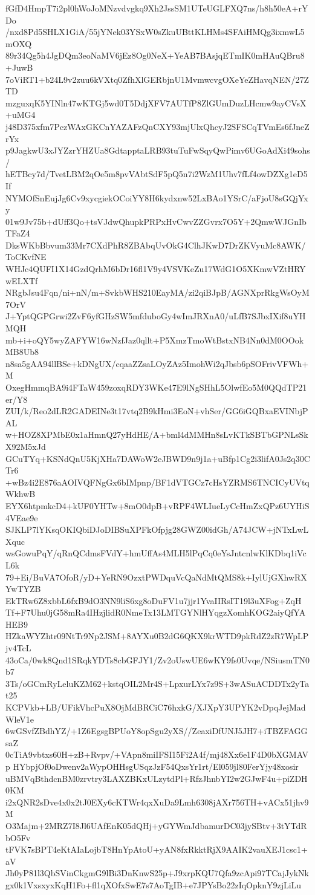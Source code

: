 fGfD4HmpT7i2pl0hWoJoMNzvdvgkq9Xh2JssSM1UTeUGLFXQ7ns/h8h50eA+rYDo
/nxd8Pd5SHLX1GiA/55jYNek03YSxW0sZkuUBttKLHMs4SFAiHMQg3ixmwL5mOXQ
89r34Qg5h4JgDQm3eoNaMV6jEz8Og0NeX+YeAB7BAsjqETmIK0mHAuQBru8+JuwB
7oViRT1+b24L9v2zuu6kVXtq0ZfhXlGERbjnU1MvmwcvgOXeYeZHavqNEN/27ZTD
mzguxqK5YINln47wKTGj5wd0T5DdjXFV7AUTfP8ZlGUmDuzLHcmw9ayCVsX+uMG4
j48D375xfm7PczWAxGKCnYAZAFzQnCXY93mjUlxQhcyJ2SFSCqTVmEs6fJneZrYx
p9JagkwU3xJYZzrYHZUa8GdtapptaLRB93tuTuFwSqyQwPimv6UGoAdXi49sohs/
hETBcy7d/TvetLBM2qOe5m8pvVAbtSdF5pQ5n7i2WzM1Uhv7fLf4owDZXg1eD5If
NYMOfSnEujJg6Cv9xycgiekOCoiYY8H6kydxnw52LxBAo1YSrC/aFjoU8sGQjYxy
01w9Jv75b+dUff3Qo+tsVJdwQhupkPRPxHvCwvZZGvrx7O5Y+2QmwWJGnIbTFaZ4
DksWKbBbvum33Mr7CXdPhR8ZBAbqUvOkG4ClhJKwD7DrZKVyuMc8AWK/ToCKvfNE
WHJc4QUFI1X14GzdQrhM6bDr16fl1V9y4VSVKeZu17WdG1O5XKmwVZtHRYwELXTf
NRgbJsu4Fqn/ni+nN/m+SvkbWHS210EayMA/zi2qiBJpB/AGNXprRkgWsOyM7OrV
J+YptQGPGrwi2ZvF6yfGHzSW5mfduboGy4wImJRXnA0/uLfB7SJbxIXif8uYHMQH
mb+i+oQY5wyZAFYW16wNzfJaz0qllt+P5XmzTmoWtBstxNB4Nn0dM0OOokMB8Ub8
n8sa5gAA94llBSe+kDNgUX/cqaaZZsaLOyZAz5ImohWi2qJbsb6pSOFrivVFWh+M
OxegHmmqBA9i4FTaW459zoxqRDY3WKe47E9lNgSHhL5OlwfEo5M0QQdTP21er/Y8
ZUI/k/Reo2dLR2GADEINe3t17vtq2B9kHmi3EoN+vhSer/GG6iGQBxaEVINbjPAL
w+HOZ8XPMbE0x1aHmnQ27yHdHE/A+bml4dMMHn8sLvKTkSBTbGPNLsSkX92M5xJd
GCuTYq+KSNdQnU5KjXHa7DAWoW2eJBWD9n9j1a+uBfp1Cg2i3lifA0Js2q30CTr6
+wBz4i2E876aAOIVQFNgGx6bIMpnp/BF1dVTGCz7cHsYZRMS6TNCICyUVtqWkhwB
EYX6htpmkcD4+kUF0YHTw+8mO0dpB+vRPF4WLIueLyCcHmZxQPz6UYHiS4VEae9e
SJKLP7lYKsqOKIQbiDJoDIBSuXPFkOfpjg28GWZ00idGh/A74JCW+jNTxLwLXquc
wsGowuPqY/qRnQCdmsFVdY+hmUffAs4MLH5lPqCq0eYsJntcnlwKlKDbq1iVcL6k
79+Ei/BuVA7OfoR/yD+YeRN9OzxtPWDquVcQaNdMtQMS8k+IylUjGXhwRXYwTYZB
EkTRw6Z8xbbL6fxB9dO3NN9liS6xg8oDuFV1u7jjr1YvaIIRsIT19l3uXFog+ZqH
Tf+F7Uhu0jG58mRa4IHzjlidR0NmeTx13LMTGYNlHYqgzXomhKOG2aiyQfYAHEB9
HZkaWYZhtr09NtTr9Np2JSM+8AYXu0B2dG6QKX9krWTD9pkRdZ2zR7WpLPjv4TcL
43oCa/0wk8Qnd1SRqkYDTs8cbGFJY1/Zv2oUswUE6wKY9fs0Uvqe/NSiusmTN0b7
3Ts/oGCmRyLeluKZM62+kstqOIL2Mr4S+LpxurLYx7z9S+3wASuACDDTx2yTat25
KCPVkb+LB/UFikVhcPuX8OjMdBRCiC76hxkG/XJXpY3UPYK2vDpqJejMadWleV1e
6wGSvfZBdhYZ/+1Z6EgsgBPUoY8opSgu2yXS//ZeaxiDfUNJ5JH7+iTBZFAGGsaZ
0cTiA9vbtxs60H+zB+Rvpv/+VApn8miIFSI15Fi2A4f/mj48Xx6e1F4D0bXGMAVp
HYbpjOf0oDwenv2aWypOHHsgUSqzJzF54QxsYr1rt/El059jl80FerYjy48xosir
uBMVqBthdcnBM0zrvtry3LAXZBKxULzytdPl+RfzJhnbYI2w2GJwF4u+piZDH0KM
i2xQNR2sDve4x0x2tJ0EXy6cKTWr4qxXuDa9Lmh6308jAXr756TH+vACx51jhv9M
O3Majm+2MRZ7I8Jl6UAfEnK05dQHj+yGYWmJdbamurDC03jySBtv+3tYTdRbO5Fv
tFVK7sBPT4eKtAIaLojbT8HnYpAtoU+yAN8fxRkktRjX9AAIK2vauXEJ1csc1+aV
Jh0yP81l3QbSVinCkgmG9lBi3DnKnwS25p+J9xrpKQU7Qfa9zcApi97TCajJykNk
gx0k1VxsxyxKqH1Fo+fl1qXOfxSwE7s7AoTgIB+e7JPYsBo22zIqOpknY9zjLiLu
